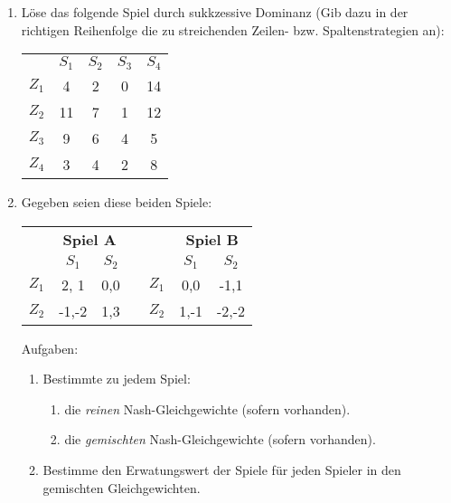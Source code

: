 \begin{enumerate}
  \item Löse das folgende Spiel durch sukkzessive Dominanz (Gib dazu in der
  richtigen Reihenfolge die zu streichenden Zeilen- bzw. Spaltenstrategien an):
\begin{center}
\begin{tabular}{c|c|c|c|c|}
\multicolumn{1}{c}{} & 
\multicolumn{1}{c}{$S_1$} &
\multicolumn{1}{c}{$S_2$} &
\multicolumn{1}{c}{$S_3$} &
\multicolumn{1}{c}{$S_4$} \\ \cline{2-5}
$Z_1$ & 4 & 2 & 0 & 14 \\ \cline{2-5}
$Z_2$ & 11& 7 & 1 & 12 \\ \cline{2-5}
$Z_3$ & 9 & 6 & 4 & 5  \\ \cline{2-5}
$Z_4$ & 3 & 4 & 2 & 8  \\ \cline{2-5}
\end{tabular}
\end{center}

  \item Gegeben seien diese beiden Spiele:

\begin{center}
\begin{tabular}{c|c|c|cc|c|c|}
\multicolumn{1}{c}{} & \multicolumn{2}{c}{{\bf Spiel A}} & 
\multicolumn{2}{c}{} & \multicolumn{2}{c}{{\bf Spiel B}}
\\ 
\multicolumn{1}{c}{} & \multicolumn{1}{c}{$S_1$} & \multicolumn{1}{c}{$S_2$} 
& &
\multicolumn{1}{c}{} & \multicolumn{1}{c}{$S_1$} & \multicolumn{1}{c}{$S_2$} 
\\ \cline{2-3} \cline{6-7}
$Z_1$ &  2, 1  & 0,0 &  &  $Z_1$ & 0,0  & -1,1  \\ \cline{2-3} \cline{6-7}
$Z_2$ & -1,-2  & 1,3 &  &  $Z_2$ & 1,-1 & -2,-2 \\  \cline{2-3} \cline{6-7}
\end{tabular}
\end{center}

  Aufgaben:
  \begin{enumerate}
    \item Bestimmte zu jedem Spiel:
      \begin{enumerate}
        \item die {\em reinen} Nash-Gleichgewichte (sofern vorhanden).
        \item die {\em gemischten} Nash-Gleichgewichte (sofern vorhanden).
      \end{enumerate} 
    \item Bestimme den Erwatungswert der Spiele für jeden Spieler in den
    gemischten Gleichgewichten.
  \end{enumerate} 

\end{enumerate}

